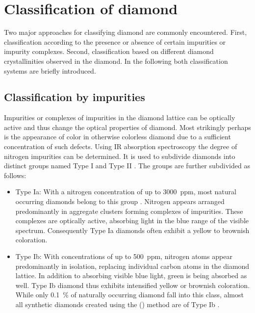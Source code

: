 \section{Classification of diamond}

  Two major approaches for classifying diamond are commonly encountered. First, classification according to the presence or absence of certain impurities or impurity complexes. Second, classification based on different diamond crystallinities observed in the diamond. In the following both classification systems are briefly introduced.

  \subsection{Classification by impurities}

    Impurities or complexes of impurities in the diamond lattice can be optically active and thus change the optical properties of diamond. Most strikingly perhaps is the appearance of color in otherwise colorless diamond due to a sufficient concentration of such defects. Using IR absorption spectroscopy the degree of nitrogen impurities can be determined. It is used to subdivide diamonds into distinct groups named Type I and Type II \cite{Kaiser1959, Breeding2009}. The groups are further subdivided as follows:

    \begin{itemize}
          \item Type Ia: With a nitrogen concentration of up to \SI{3000}{ppm}, most natural occurring diamonds belong to this group \cite{Zaitsev2001}. Nitrogen appears arranged predominantly in aggregate clusters forming complexes of impurities. These complexes are optically active, absorbing light in the blue range of the visible spectrum. Consequently Type Ia diamonds often exhibit a yellow to brownish coloration.

          \item Type Ib: With concentrations of up to \SI{500}{ppm}, nitrogen atoms appear predominantly in isolation, replacing individual carbon atoms in the diamond lattice. In addition to absorbing visible blue light, green is being absorbed as well. Type Ib diamond thus exhibits intensified yellow or brownish coloration. While only \SI{0.1}{\percent} of naturally occurring diamond fall into this class, almost all synthetic diamonds created using the \hpht (\HPHT) method are of Type Ib \cite{Zaitsev2001}.
    \end{itemize}


